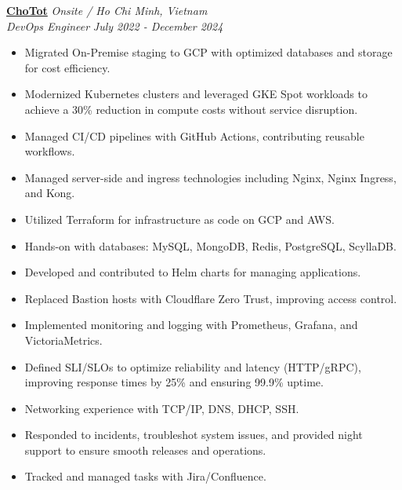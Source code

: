 \documentclass[11pt, a4paper]{article}
\begin{document}
\vspace{0.5em}
\textbf{\href{https://www.chotot.com/}{ChoTot}} \hfill {\small\textit{Onsite / Ho Chi Minh, Vietnam}} \\
\textit{DevOps Engineer} \hfill {\small\textit{July 2022 - December 2024}}
\begin{itemize}[leftmargin=*]
    \item Migrated On-Premise staging to GCP with optimized databases and storage for cost efficiency.
    \item Modernized Kubernetes clusters and leveraged GKE Spot workloads to achieve a 30\% reduction in compute costs without service disruption.
    \item Managed CI/CD pipelines with GitHub Actions, contributing reusable workflows.
    \item Managed server-side and ingress technologies including Nginx, Nginx Ingress, and Kong.
    \item Utilized Terraform for infrastructure as code on GCP and AWS.
    \item Hands-on with databases: MySQL, MongoDB, Redis, PostgreSQL, ScyllaDB.
    \item Developed and contributed to Helm charts for managing applications.
    \item Replaced Bastion hosts with Cloudflare Zero Trust, improving access control.
    \item Implemented monitoring and logging with Prometheus, Grafana, and VictoriaMetrics.
    \item Defined SLI/SLOs to optimize reliability and latency (HTTP/gRPC), improving response times by 25\% and ensuring 99.9\% uptime.
    \item Networking experience with TCP/IP, DNS, DHCP, SSH.
    \item Responded to incidents, troubleshot system issues, and provided night support to ensure smooth releases and operations.
    \item Tracked and managed tasks with Jira/Confluence.
\end{itemize}
\end{document}
